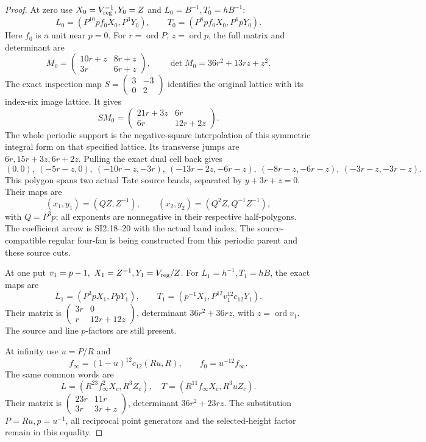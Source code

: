 \begin{proof}
At zero use \(X_0=V_{\rm reg}^{-1},Y_0=Z\) and
\(L_0=B^{-1},T_0=hB^{-1}\):
\[
 L_0=(P^{10}p f_0X_0,P^3Y_0),\qquad
 T_0=(P^8p f_0X_0,P^6pY_0).
 \tag{SI2.41}
\]
Here \(f_0\) is a unit near \(p=0\). For \(r=\operatorname{ord}P\),
\(z=\operatorname{ord}p\), the full matrix and determinant are
\[
 M_0=\begin{pmatrix}10r+z&8r+z\\3r&6r+z\end{pmatrix},\qquad
 \det M_0=36r^2+13rz+z^2.
 \tag{SI2.42}
\]
The exact inspection map \(S=\left(\begin{smallmatrix}3&-3\\0&2\end{smallmatrix}\right)\)
identifies the original lattice with its index-six image lattice.
It gives
\[
 SM_0=\begin{pmatrix}21r+3z&6r\\6r&12r+2z\end{pmatrix}.
 \tag{SI2.43}
\]
The whole periodic support is the negative-square interpolation of
this symmetric integral form on that specified lattice. Its transverse
jumps are \(6r,15r+3z,6r+2z\). Pulling the exact dual cell back gives
\[
 (0,0),\ (-5r-z,0),\ (-10r-z,-3r),\
 (-13r-2z,-6r-z),\ (-8r-z,-6r-z),\ (-3r-z,-3r-z).
 \tag{SI2.44}
\]
This polygon spans two actual Tate source bands, separated by
\(y+3r+z=0\). Their maps are
\[
 (x_1,y_1)=(QZ,Z^{-1}),\qquad
 (x_2,y_2)=(Q^2Z,Q^{-1}Z^{-1}),
 \tag{SI2.45}
\]
with \(Q=P^3p\); all exponents are nonnegative in their respective
half-polygons. The coefficient arrow is SI2.18--20 with the actual
band index. The source-compatible regular four-fan is being
constructed from this periodic parent and these source cuts.

At one put \(v_1=p-1,\ X_1=Z^{-1},Y_1=V_{\rm reg}/Z\).
For \(L_1=h^{-1},T_1=hB\), the exact maps are
\[
 L_1=(P^3pX_1,PpY_1),\qquad
 T_1=(p^{-1}X_1,P^{12}v_1^{12}c_{12}Y_1).
 \tag{SI2.46}
\]
Their matrix is
\(\left(\begin{smallmatrix}3r&0\\r&12r+12z\end{smallmatrix}\right)\),
determinant \(36r^2+36rz\), with \(z=\operatorname{ord}v_1\).
The source and line \(p\)-factors are still present.

At infinity use \(u=P/R\) and
\[
 f_\infty=(1-u)^{12}c_{12}(Ru,R),\qquad f_0=u^{-12}f_\infty.
\]
The same common words are
\[
 L=(R^{23}f_\infty^2X_c,R^3Z_c),\quad
 T=(R^{11}f_\infty X_c,R^3uZ_c).
 \tag{SI2.47}
\]
Their matrix is
\(\left(\begin{smallmatrix}23r&11r\\3r&3r+z\end{smallmatrix}\right)\),
determinant \(36r^2+23rz\). The substitution \(P=Ru,p=u^{-1}\),
all reciprocal point generators and the selected-height factor remain
in this equality.


\end{proof}
